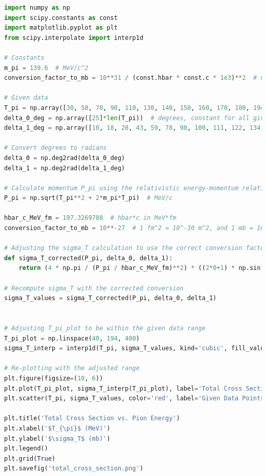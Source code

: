 \documentclass[12pt]{article}
\begin{document}
\begin{lstlisting}[language=Python]
import numpy as np
import scipy.constants as const
import matplotlib.pyplot as plt
from scipy.interpolate import interp1d

# Constants
m_pi = 139.6  # MeV/c^2
conversion_factor_to_mb = 10**31 / (const.hbar * const.c * 1e3)**2  # Convert to mb using hbar in MeV*s and c in m/s, then to m^2

# Given data
T_pi = np.array([30, 50, 70, 90, 110, 130, 140, 150, 160, 170, 180, 194])  # MeV
delta_0_deg = np.array([25]*len(T_pi))  # degrees, constant for all given T_pi
delta_1_deg = np.array([10, 18, 28, 43, 59, 78, 90, 100, 111, 122, 134, 154])  # degrees

# Convert degrees to radians
delta_0 = np.deg2rad(delta_0_deg)
delta_1 = np.deg2rad(delta_1_deg)

# Calculate momentum P_pi using the relativistic energy-momentum relation
P_pi = np.sqrt(T_pi**2 + 2*m_pi*T_pi)  # MeV/c

hbar_c_MeV_fm = 197.3269788  # hbar*c in MeV*fm
conversion_factor_to_mb = 10**-27  # 1 fm^2 = 10^-30 m^2, and 1 mb = 10^-31 m^2, so 1 fm^2 = 10 mb

# Adjusting the sigma_T calculation to use the correct conversion factor
def sigma_T_corrected(P_pi, delta_0, delta_1):
    return (4 * np.pi / (P_pi / hbar_c_MeV_fm)**2) * ((2*0+1) * np.sin(delta_0)**2 + (2*1+1) * np.sin(delta_1)**2) * conversion_factor_to_mb

# Recompute sigma_T with the corrected conversion
sigma_T_values = sigma_T_corrected(P_pi, delta_0, delta_1)


# Adjusting T_pi_plot to be within the given data range
T_pi_plot = np.linspace(40, 194, 400)
sigma_T_interp = interp1d(T_pi, sigma_T_values, kind='cubic', fill_value="extrapolate")

# Re-plotting with the adjusted range
plt.figure(figsize=(10, 6))
plt.plot(T_pi_plot, sigma_T_interp(T_pi_plot), label='Total Cross Section')
plt.scatter(T_pi, sigma_T_values, color='red', label='Given Data Points')  # Highlight the given data points

plt.title('Total Cross Section vs. Pion Energy')
plt.xlabel('$T_{\pi}$ (MeV)')
plt.ylabel('$\sigma_T$ (mb)')
plt.legend()
plt.grid(True)
plt.savefig('total_cross_section.png')


\end{lstlisting}
\end{document}
